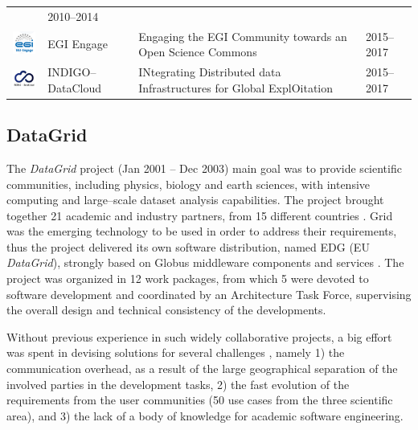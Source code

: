 \documentclass[journal]{IEEEtran}
\begin{document}
\begin{table}[!h]
\begin{tabular}{p{1.6cm}p{1.5cm}p{3cm}l}
 & 2010--2014\\
\begin{minipage}{.3\textwidth}
\includegraphics[width=15mm,height=7.5mm]{images/egi_engage}
\end{minipage}
     & EGI Engage &
Engaging the EGI Community towards an Open Science Commons
 & 2015--2017\\
\begin{minipage}{.3\textwidth}
\includegraphics[width=15mm,height=7.5mm]{images/indigo}
\end{minipage}
     & INDIGO--DataCloud &
INtegrating Distributed data Infrastructures for Global ExplOitation
 & 2015--2017\\
\hline
\hline
\end{tabular}
\end{table}

\subsection{DataGrid}

The {\sl DataGrid} \cite{cordis:datagrid} project (Jan 2001 -- Dec 2003)
main goal was to provide scientific communities, including physics, biology and
earth sciences, with intensive computing and large--scale dataset analysis capabilities.
The project brought together 21 academic and industry partners, from 15 different countries \cite{gagliardi}.
Grid was the emerging technology to be used in order to address their requirements,
thus the project delivered its own software distribution, named EDG (EU {\sl DataGrid}), strongly
based on Globus middleware components and services \cite{globus}. The project was organized in 12 work packages, from
which 5 were devoted to software development and coordinated by an
Architecture Task Force, supervising the overall design and technical consistency
of the developments.

Without previous experience in such widely
collaborative projects, a big effort was spent in devising solutions for several
challenges \cite{datagrid}, namely 1) the communication overhead, as a
result of the large geographical separation of the involved parties in the
development tasks, 2) the fast evolution of the requirements from the user
communities (50 use cases from the three scientific area), and 3) the lack of a body
of knowledge for academic software engineering.
\end{document}

